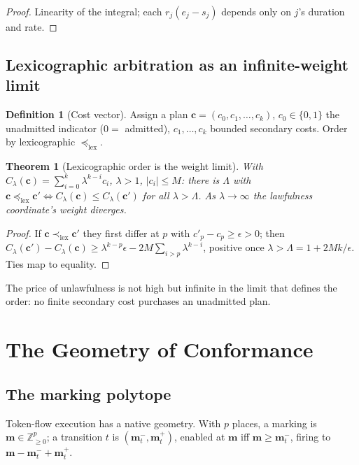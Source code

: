 \documentclass[11pt,oneside]{book}
\theoremstyle{definition}
\newtheorem{definition}{Definition}[chapter]
\theoremstyle{plain}
\newtheorem{theorem}{Theorem}[chapter]
\theoremstyle{remark}
\begin{document}
\begin{proof}
Linearity of the integral; each $r_j(e_j-s_j)$ depends only on $j$'s duration and rate. \end{proof}

\section{Lexicographic arbitration as an infinite-weight limit}

\begin{definition}[Cost vector]\label{def:costvector}
Assign a plan $\bm c=(c_0,c_1,\dots,c_k)$, $c_0\in\{0,1\}$ the unadmitted indicator ($0=$
admitted), $c_1,\dots,c_k$ bounded secondary costs. Order by lexicographic $\preceq_{\mathrm{lex}}$.
\end{definition}

\begin{theorem}[Lexicographic order is the weight limit]\label{thm:lex}
With $C_\lambda(\bm c)=\sum_{i=0}^k\lambda^{k-i}c_i$, $\lambda>1$, $|c_i|\le M$: there is
$\Lambda$ with $\bm c\preceq_{\mathrm{lex}}\bm c'\iff C_\lambda(\bm c)\le C_\lambda(\bm c')$
for all $\lambda>\Lambda$. As $\lambda\to\infty$ the lawfulness coordinate's weight diverges.
\end{theorem}

\begin{proof}
If $\bm c\prec_{\mathrm{lex}}\bm c'$ they first differ at $p$ with $c'_p-c_p\ge\epsilon>0$;
then $C_\lambda(\bm c')-C_\lambda(\bm c)\ge\lambda^{k-p}\epsilon-2M\sum_{i>p}\lambda^{k-i}$,
positive once $\lambda>\Lambda=1+2Mk/\epsilon$. Ties map to equality. \end{proof}

The price of unlawfulness is not high but infinite in the limit that defines the order: no
finite secondary cost purchases an unadmitted plan.

\chapter{The Geometry of Conformance}
\label{ch:geo}

\section{The marking polytope}

Token-flow execution has a native geometry. With $p$ places, a marking is
$\bm m\in\mathbb Z_{\ge0}^p$; a transition $t$ is $(\bm m^-_t,\bm m^+_t)$, enabled at $\bm m$
iff $\bm m\ge\bm m^-_t$, firing to $\bm m-\bm m^-_t+\bm m^+_t$.
\end{document}
